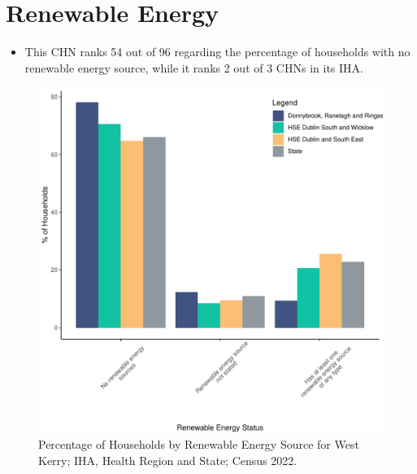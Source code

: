 \documentclass{article}
\begin{document}
\section{Renewable Energy}\label{sect:RE}
\begin{itemize}
\item This CHN ranks  54 out of 96 regarding the percentage of households with no renewable energy source, while it ranks   2 out of 3 CHNs in its IHA.
\end{itemize}
\begin{figure}[H]
	\centering
	\includegraphics[width = 140mm]{../figures/RenewableEnergyED.pdf}
	\caption{Percentage of Households by Renewable Energy Source for West Kerry; IHA, Health Region and State; Census 2022.}
	\label{fig:vbnv}
	\end{figure}
\end{document}

